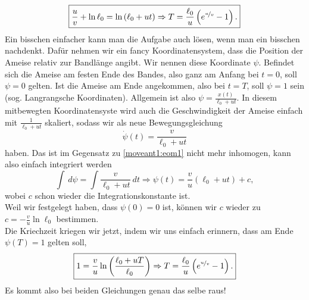 \begin{Answer}[ref = moveant]
	\begin{equation}\label{moveant1:eom1sol}
	\boxed{
		\frac{u}{v} + \ln \ell_0 = \ln\left(\ell_0 + u t\right) \Rightarrow T = \frac{\ell_0}{u}\left(e^{\nicefrac{u}{v}}-1\right).}
	\end{equation}
	Ein bisschen einfacher kann man die Aufgabe auch lösen, wenn man ein bisschen nachdenkt. Dafür nehmen wir ein fancy Koordinatensystem, dass die Position der Ameise relativ zur Bandlänge angibt. Wir nennen diese Koordinate $\psi$. Befindet sich die Ameise am festen Ende des Bandes, also ganz am Anfang bei $t=0$, soll $\psi = 0$ gelten. Ist die Ameise am Ende angekommen, also bei $t=T$, soll $\psi  = 1$ sein (sog. Langrangsche Koordinaten). Allgemein ist also $\psi = \frac{x\left(t\right)}{\ell_0 + ut}$. In diesem mitbewegten Koordinatensyste wird auch die Geschwindigkeit der Ameise einfach mit $\frac{1}{\ell_0 + ut}$ skaliert, sodass wir als neue Bewegungsgleichung
	\begin{equation}\label{moveant1:eom2}
		\dot{\psi}\left(t\right) = \frac{v}{\ell_0 + ut}
	\end{equation}
	haben. Das ist im Gegensatz zu \eqref{moveant1:eom1} nicht mehr inhomogen, kann also einfach integriert werden
	\begin{equation*}
		\int~d\psi  = \int \frac{v}{\ell_0 + u t}~dt \Rightarrow \psi\left(t\right)= \frac{v}{u}\left(\ell_0 + ut\right) + c,
	\end{equation*}
	wobei $c$ schon wieder die Integrationskonstante ist.\\
	Weil wir festgelegt haben, dass $\psi\left(0\right) = 0$ ist, können wir $c$ wieder zu $c = -\frac{v}{u}\ln \ell_0$ bestimmen.\\
	Die Kriechzeit kriegen wir jetzt, indem wir uns einfach erinnern, dass am Ende $\psi\left(T\right) = 1$ gelten soll,
	\begin{equation}\label{moveant1:eom2sol}
	\boxed{
		1 = \frac{v}{u}\ln\left(\frac{\ell_0 + u T}{\ell_0}\right) \Rightarrow T = \frac{\ell_0}{u}\left(e^{\nicefrac{u}{v}}-1\right).} 
	\end{equation}
	Es kommt also bei beiden Gleichungen genau das selbe raus!
\end{Answer}